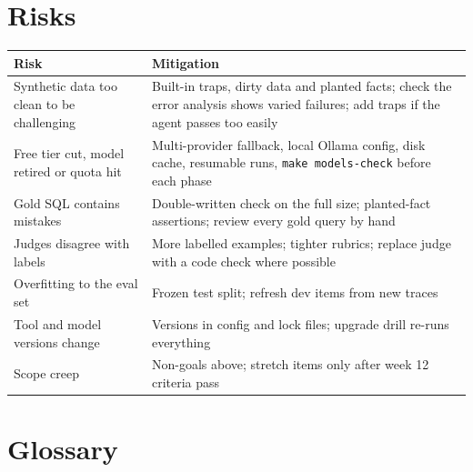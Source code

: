 \documentclass[11pt,a4paper]{article}
\newcommand{\code}[1]{\texttt{\small #1}}
\begin{document}
\section{Risks}

\begin{center}
\small
\begin{tabularx}{\linewidth}{@{}X X@{}}
\toprule
\textbf{Risk} & \textbf{Mitigation}\\
\midrule
Synthetic data too clean to be challenging & Built-in traps, dirty data and planted facts; check the error analysis shows varied failures; add traps if the agent passes too easily\\
Free tier cut, model retired or quota hit & Multi-provider fallback, local Ollama config, disk cache, resumable runs, \code{make models-check} before each phase\\
Gold SQL contains mistakes & Double-written check on the full size; planted-fact assertions; review every gold query by hand\\
Judges disagree with labels & More labelled examples; tighter rubrics; replace judge with a code check where possible\\
Overfitting to the eval set & Frozen test split; refresh dev items from new traces\\
Tool and model versions change & Versions in config and lock files; upgrade drill re-runs everything\\
Scope creep & Non-goals above; stretch items only after week 12 criteria pass\\
\bottomrule
\end{tabularx}
\end{center}

\section{Glossary}
\end{document}
